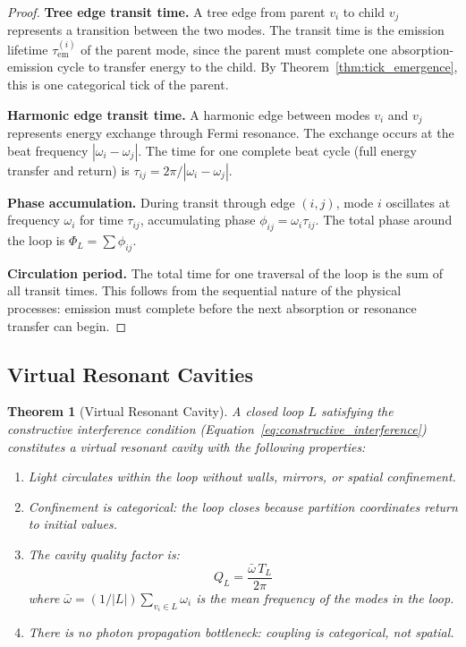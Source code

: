 \documentclass[11pt,twocolumn,a4paper]{article}
\newtheorem{theorem}{Theorem}[section]
\theoremstyle{definition}
\theoremstyle{remark}
\newcommand{\tem}{\tau_{\mathrm{em}}}
\begin{document}
\begin{proof}
\textbf{Tree edge transit time.} A tree edge from parent $v_i$ to child $v_j$ represents a transition between the two modes. The transit time is the emission lifetime $\tem^{(i)}$ of the parent mode, since the parent must complete one absorption-emission cycle to transfer energy to the child. By Theorem~\ref{thm:tick_emergence}, this is one categorical tick of the parent.

\textbf{Harmonic edge transit time.} A harmonic edge between modes $v_i$ and $v_j$ represents energy exchange through Fermi resonance. The exchange occurs at the beat frequency $|\omega_i - \omega_j|$. The time for one complete beat cycle (full energy transfer and return) is $\tau_{ij} = 2\pi/|\omega_i - \omega_j|$.

\textbf{Phase accumulation.} During transit through edge $(i,j)$, mode $i$ oscillates at frequency $\omega_i$ for time $\tau_{ij}$, accumulating phase $\phi_{ij} = \omega_i \tau_{ij}$. The total phase around the loop is $\Phi_L = \sum \phi_{ij}$.

\textbf{Circulation period.} The total time for one traversal of the loop is the sum of all transit times. This follows from the sequential nature of the physical processes: emission must complete before the next absorption or resonance transfer can begin.
\end{proof}

\subsection{Virtual Resonant Cavities}

\begin{theorem}[Virtual Resonant Cavity]
\label{thm:virtual_cavity}
A closed loop $L$ satisfying the constructive interference condition (Equation~\ref{eq:constructive_interference}) constitutes a virtual resonant cavity with the following properties:
\begin{enumerate}[nosep]
\item Light circulates within the loop without walls, mirrors, or spatial confinement.
\item Confinement is categorical: the loop closes because partition coordinates return to initial values.
\item The cavity quality factor is:
\begin{equation}
Q_L = \frac{\bar{\omega} \, T_L}{2\pi}
\label{eq:quality_factor}
\end{equation}
where $\bar{\omega} = (1/|L|) \sum_{v_i \in L} \omega_i$ is the mean frequency of the modes in the loop.
\item There is no photon propagation bottleneck: coupling is categorical, not spatial.
\end{enumerate}
\end{theorem}
\end{document}
